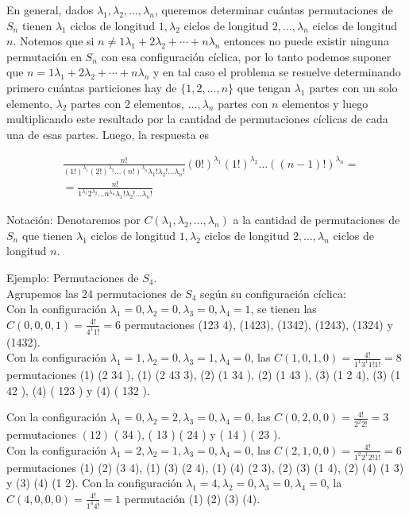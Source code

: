 \documentclass[10pt]{article}
\begin{document}
En general, dados $\lambda_{1}, \lambda_{2}, \ldots, \lambda_{n}$, queremos determinar cuántas permutaciones de $S_{n}$ tienen $\lambda_{1}$ ciclos de longitud $1, \lambda_{2}$ ciclos de longitud $2, \ldots, \lambda_{n}$ ciclos de longitud $n$. Notemos que si $n \neq 1 \lambda_{1}+2 \lambda_{2}+\cdots+n \lambda_{n}$ entonces no puede existir ninguna permutación en $S_{n}$ con esa configuración cíclica, por lo tanto podemos suponer que $n=1 \lambda_{1}+2 \lambda_{2}+\cdots+n \lambda_{n}$ y en tal caso el problema se resuelve determinando primero cuántas particiones hay de $\{1,2, \ldots, n\}$ que tengan $\lambda_{1}$ partes con un solo elemento, $\lambda_{2}$ partes con 2 elementos, $\ldots, \lambda_{n}$ partes con $n$ elementos y luego multiplicando este resultado por la cantidad de permutaciones cíclicas de cada una de esas partes. Luego, la respuesta es

$$
\begin{aligned}
& \frac{n!}{(1!)^{\lambda_{1}}(2!)^{\lambda_{2}} \ldots(n!)^{\lambda_{n}} \lambda_{1}!\lambda_{2}!\ldots \lambda_{n}!}(0!)^{\lambda_{1}}(1!)^{\lambda_{2}} \ldots((n-1)!)^{\lambda_{n}}= \\
& =\frac{n!}{1^{\lambda_{1}} 2^{\lambda_{2}} \ldots n^{\lambda_{n}} \lambda_{1}!\lambda_{2}!\ldots \lambda_{n}!}
\end{aligned}
$$

Notación: Denotaremos por $C\left(\lambda_{1}, \lambda_{2}, \ldots, \lambda_{n}\right)$ a la cantidad de permutaciones de $S_{n}$ que tienen $\lambda_{1}$ ciclos de longitud $1, \lambda_{2}$ ciclos de longitud $2, \ldots, \lambda_{n}$ ciclos de longitud $n$.

Ejemplo: Permutaciones de $S_{4}$.\\
Agrupemos las 24 permutaciones de $S_{4}$ según su configuración cíclica:\\
Con la configuración $\lambda_{1}=0, \lambda_{2}=0, \lambda_{3}=0, \lambda_{4}=1$, se tienen las $C(0,0,0,1)=\frac{4!}{4^{1} 1!}=6$ permutaciones (123 4), (1423), (1342), (1243), (1324) y (1432).\\
Con la configuración $\lambda_{1}=1, \lambda_{2}=0, \lambda_{3}=1, \lambda_{4}=0$, las $C(1,0,1,0)=\frac{4!}{1^{1} 3^{1} 1!1!}=8$ permutaciones (1) (2 34 ), (1) (2 43 3), (2) (1 34 ), (2) (1 43 ), (3) (1 2 4), (3) (1 42 ), (4) ( 123 ) y (4) ( 132 ).

Con la configuración $\lambda_{1}=0, \lambda_{2}=2, \lambda_{3}=0, \lambda_{4}=0$, las $C(0,2,0,0)=\frac{4!}{2^{2} 2!}=3$ permutaciones $(12)$ ( 34 ), ( 13 ) ( 24 ) y ( 14 ) ( 23 ).\\
Con la configuración $\lambda_{1}=2, \lambda_{2}=1, \lambda_{3}=0, \lambda_{4}=0$, las $C(2,1,0,0)=\frac{4!}{1^{2} 2^{1} 2!1!}=6$ permutaciones (1) (2) (3 4), (1) (3) (2 4), (1) (4) (2 3), (2) (3) (1 4), (2) (4) (1 3) y (3) (4) (1 2). Con la configuración $\lambda_{1}=4, \lambda_{2}=0, \lambda_{3}=0, \lambda_{4}=0$, la $C(4,0,0,0)=\frac{4!}{1^{4} 4!}=1$ permutación (1) (2) (3) (4).
\end{document}
